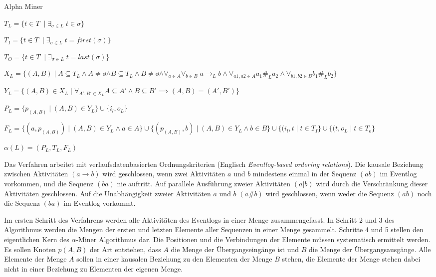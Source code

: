 \providecommand\algorithmname{alphaminer}
\begin{algorithm}
  \caption{Alpha Miner}
  \label{alg:alphaminer}
  \begin{algorithmic}[1]
    \State $T_L = \{ t \in T \;\mid \exists_{\sigma \in L} \; t \in \sigma\}$ \label{op0}
    
    \State $T_I = \{ t \in T \;\mid \exists_{\sigma \in L} \; t=first(\sigma)\}$ \label{op1}
    
    \State $T_O = \{ t \in T \;\mid \exists_{\sigma \in L} \; t=last(\sigma)\}$ \label{op2}
    
    \State $X_L = \{ (A,B) \mid A \subseteq T_L \land A \neq $\o$ \land B \subseteq T_L \land B \neq $\o$ \land \forall_{a\in A} \forall_{b\in B}\; a \to _L b \land \forall_{a1,a2\in A} a_1 \# _L a_2 \land \forall_{b1,b2\in B} b_1 \# _L b_2\}$ \label{op3}
    
    \State $Y_L = \{ (A,B) \in X_L \mid \forall_{A',B' \in X_L} A \subseteq A' \land B \subseteq B' \implies (A,B) = (A',B')\}$ \label{op4}
    
    \State $P_L = \{ p_{(A,B)} \mid (A,B) \in Y_L \} \cup \{i_l, o_L \}$ \label{op5}
    
    \State $F_L = \{ (a,p_{(A,B)}) \mid (A,B) \in Y_L \land a \in A \} \cup \{  (p_ {(A,B)},b) \mid (A,B) \in Y_L \land b \in B \} \cup \{ (i_l,t \mid t \in T_I  \} \cup \{ (t,o_L \mid t\in T_o\}$ \label{op6}
    
    \State $\alpha(L) = (P_L, T_L, F_L) $ \label{op7}
    
  \end{algorithmic}
\end{algorithm}

Das Verfahren arbeitet mit verlaufsdatenbasierten Ordnungskriterien (Englisch \textit{Eventlog-based ordering relations}). Die kausale Beziehung zwischen Aktivitäten $(a→b)$ wird geschlossen, wenn zwei Aktivitäten $a$ und $b$ mindestens einmal in der Sequenz $(ab)$ im Eventlog vorkommen, und die Sequenz $(ba)$ nie auftritt. Auf parallele Ausführung zweier Aktivitäten $(a|b)$ wird durch die Verschränkung dieser Aktivitäten geschlossen. Auf die Unabhängigkeit zweier Aktivitäten $a$ und $b$ $(a\#b)$ wird geschlossen, wenn weder die Sequenz $(ab)$ noch die Sequenz $(ba)$ im Eventlog vorkommt.

Im ersten Schritt des Verfahrens werden alle Aktivitäten des Eventlogs in einer Menge zusammengefasst. In Schritt 2 und 3 des Algorithmus werden die Mengen der ersten und letzten Elemente aller Sequenzen in einer Menge gesammelt. 
Schritte 4 und 5 stellen den eigentlichen Kern des $\alpha$-Miner Algorithmus dar. Die Positionen und die Verbindungen der Elemente müssen systematisch ermittelt werden. Es sollen Knoten $p(A,B)$ der Art entstehen, dass $A$ die Menge der Übergangseingänge ist und $B$ die Menge der Übergangsausgänge. Alle Elemente der Menge $A$ sollen in einer kausalen Beziehung zu den Elementen der Menge $B$ stehen, die Elemente der Menge stehen dabei nicht in einer Beziehung zu Elementen der eigenen Menge.

